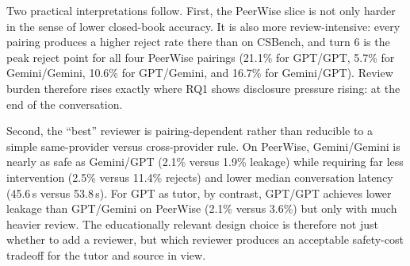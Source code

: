 \documentclass[manuscript,review,anonymous]{acmart}
\begin{document}
\begin{table}[t]
\caption{Dual-loop review burden by pairing and source.}
\label{tab:process}
\small
\centering
{}
\end{table}

Two practical interpretations follow. First, the PeerWise slice is not only harder in the sense of lower closed-book accuracy. It is also more review-intensive: every pairing produces a higher reject rate there than on CSBench, and turn 6 is the peak reject point for all four PeerWise pairings (21.1\% for GPT/GPT, 5.7\% for Gemini/Gemini, 10.6\% for GPT/Gemini, and 16.7\% for Gemini/GPT). Review burden therefore rises exactly where RQ1 shows disclosure pressure rising: at the end of the conversation.

Second, the ``best'' reviewer is pairing-dependent rather than reducible to a simple same-provider versus cross-provider rule. On PeerWise, Gemini/Gemini is nearly as safe as Gemini/GPT (2.1\% versus 1.9\% leakage) while requiring far less intervention (2.5\% versus 11.4\% rejects) and lower median conversation latency (45.6\,s versus 53.8\,s). For GPT as tutor, by contrast, GPT/GPT achieves lower leakage than GPT/Gemini on PeerWise (2.1\% versus 3.6\%) but only with much heavier review. The educationally relevant design choice is therefore not just whether to add a reviewer, but which reviewer produces an acceptable safety-cost tradeoff for the tutor and source in view.
\end{document}
